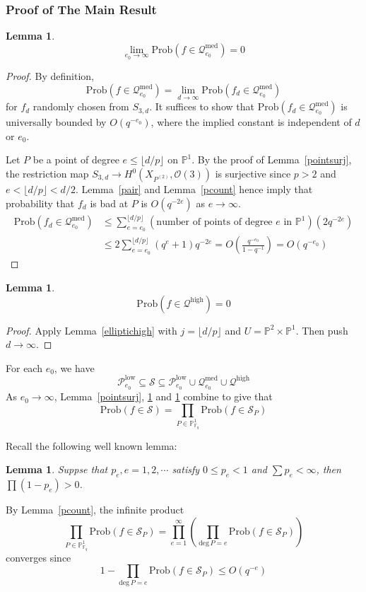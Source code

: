 \documentclass[12pt]{article}
\theoremstyle{plain}
\newtheorem{lemma}[equation]{Lemma}
\theoremstyle{definition}
\newcommand{\IF}{\mathbb{F}}
\newcommand{\IP}{\mathbb{P}}
\newcommand{\sO}{\mathcal{O}}
\newcommand{\sP}{\mathcal{P}}
\newcommand{\sQ}{\mathcal{Q}}
\newcommand{\sS}{\mathcal{S}}
\renewcommand{\deg}{\mathrm{deg}\,}
\newcommand{\<}{\langle}
\renewcommand{\>}{\rangle}
\newcommand{\Prob}{\mathrm{Prob}}
\newcommand{\fl}[1]{\lfloor #1 \rfloor}
\begin{document}
\subsubsection{Proof of The Main Result}
\begin{lemma}
\label{ellipticmed}
$$ \lim_{e_0 \to \infty} \Prob( f \in \sQ_{e_0}^{\mathrm{med}}) = 0 $$
\end{lemma}
\begin{proof}
By definition, 
$$ \Prob( f \in  \sQ_{e_0}^{\mathrm{med}}) = \lim_{d \to \infty} \Prob(f_d \in \sQ_{e_0}^{\mathrm{med}})$$
for $f_d$ randomly chosen from $S_{3, d}$. It suffices to show that $\Prob(f_d \in \sQ_{e_0}^{\mathrm{med}})$ is universally bounded by $O(q^{-e_0})$, where the implied constant is independent of $d$ or $e_0$. 

Let $P$ be a point of degree $e \le \lfloor d/p \rfloor$ on $\IP^1$. By the proof of Lemma~\ref{pointsurj}, the restriction map $S_{3, d} \to H^0(X_{P^{(2)}}, \sO(3))$ is surjective since $p > 2$ and $e < \lfloor d/p \rfloor < d/2$. Lemma~\ref{pair} and Lemma~\ref{pcount} hence imply that probability that $f_d$ is bad at $P$ is $O(q^{-2e})$ as $e \to \infty$. 
\begin{align*}
\Prob(f_d \in \sQ_{e_0}^{\mathrm{med}}) &\le \sum_{e = e_0}^{\lfloor d/p \rfloor} (\text{number of points of degree $e$ in $\IP^1$})(2q^{-2e}) \\
&\le 2 \sum_{e = e_0}^{\lfloor d/p \rfloor}(q^{e} + 1) q^{-2e} = O(\frac{q^{-e_0}}{1 - q^{-1}}) = O(q^{-e_0})
\end{align*} 
\end{proof}

\begin{lemma}
\label{elliptichighf}
$$ \Prob(f \in \sQ^{\mathrm{high}}) = 0 $$
\end{lemma}
\begin{proof}
Apply Lemma~\ref{elliptichigh} with $j = \fl{d/p}$ and $U = \IP^2 \times \IP^1$. Then push $d \to \infty$. 
\end{proof}

For each $e_0$, we have 
$$ \sP_{e_0}^{\mathrm{low}} \subseteq \sS \subseteq \sP_{e_0}^{\mathrm{low}} \cup \sQ_{e_0}^{\mathrm{med}} \cup \sQ^{\mathrm{high}}$$
As $e_0 \to \infty$, Lemma~\ref{pointsurj}, \ref{ellipticmed} and \ref{elliptichighf} combine to give that 
$$ \Prob(f \in \sS) = \prod_{P \in \IP^1_{\IF_q}} \Prob( f \in \sS_P) $$

Recall the following well known lemma:
\begin{lemma}
Suppse that $p_e, e = 1, 2, \cdots$ satisfy $0 \le p_e < 1$ and $\sum p_e < \infty$, then $\prod (1 - p_e) > 0$. 
\end{lemma}
By Lemma~\ref{pcount}, the infinite product 
$$ \prod_{P \in \IP^1_{\IF_q}} \Prob( f \in \sS_P) = \prod_{e = 1}^\infty (\prod_{\deg P = e} \Prob(f \in \sS_P))$$
converges since 
$$ 1 - \prod_{\deg P = e} \Prob(f \in \sS_P) \le O(q^{-e})$$
\end{document}
